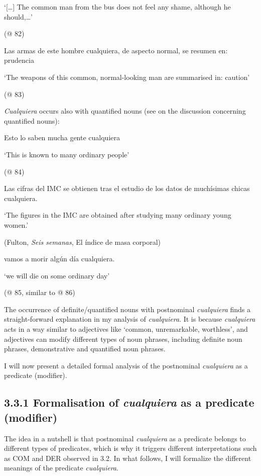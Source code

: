   ‘[…] The common man from the bus does not feel any shame, although he should,…’

  (@ 82)

  Las armas de este hombre cualquiera, de aspecto normal, se resumen en: prudencia

  ‘The weapons of this common, normal-looking man are summarised in: caution’

  (@ 83)

\textit{Cualquiera} occurs also with quantified nouns (see  on the discussion concerning quantified nouns):

\label{bkm:Ref58144031}  Esto lo saben mucha gente cualquiera 

  ‘This is known to many ordinary people’

  (@ 84)

\label{bkm:Ref63546096}  Las cifras del IMC se obtienen tras el estudio de los datos de muchísimas chicas cualquiera.

  ‘The figures in the IMC are obtained after studying many ordinary young women.’

  (Fulton, \textit{Seis semanas}, El índice de masa corporal)

  vamos a morir algún día cualquiera. 

  ‘we will die on some ordinary day’

  (@ 85, similar to @ 86)

The occurrence of definite/quantified nouns with postnominal \textit{cualquiera} finds a straight-forward explanation in my analysis of \textit{cualquiera}. It is because \textit{cualquiera} acts in a way similar to adjectives like ‘common, unremarkable, worthless’, and adjectives can modify different types of noun phrases, including definite noun phrases, demonstrative and quantified noun phrases. 

  I will now present a detailed formal analysis of the postnominal \textit{cualquiera} as a predicate (modifier). 

\subsection{\textbf{3.3.1} \textbf{Formalisation} \textbf{of} \textbf{\textit{cualquiera}} \textbf{as} \textbf{a} \textbf{predicate} \textbf{(modifier)} }

The idea in a nutshell is that postnominal \textit{cualquiera} as a predicate belongs to different types of predicates, which is why it triggers different interpretations such as COM and DER observed in 3.2. In what follows, I will formalize the different meanings of the predicate \textit{cualquiera}. 

